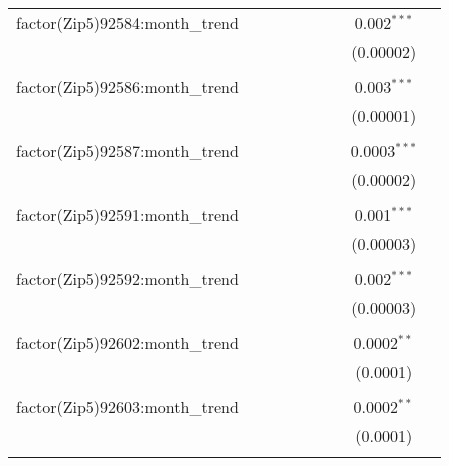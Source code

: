 \begin{table}[H]
{\begin{tabular}{@{\extracolsep{5pt}}lcccccccc}
  factor(Zip5)92584:month\_trend &  &  &  &  &  &  & 0.002$^{***}$ &  \\  

   &  &  &  &  &  &  & (0.00002) &  \\  

   & & & & & & & & \\  

  factor(Zip5)92586:month\_trend &  &  &  &  &  &  & 0.003$^{***}$ &  \\  

   &  &  &  &  &  &  & (0.00001) &  \\  

   & & & & & & & & \\  

  factor(Zip5)92587:month\_trend &  &  &  &  &  &  & 0.0003$^{***}$ &  \\  

   &  &  &  &  &  &  & (0.00002) &  \\  

   & & & & & & & & \\  

  factor(Zip5)92591:month\_trend &  &  &  &  &  &  & 0.001$^{***}$ &  \\  

   &  &  &  &  &  &  & (0.00003) &  \\  

   & & & & & & & & \\  

  factor(Zip5)92592:month\_trend &  &  &  &  &  &  & 0.002$^{***}$ &  \\  

   &  &  &  &  &  &  & (0.00003) &  \\  

   & & & & & & & & \\  

  factor(Zip5)92602:month\_trend &  &  &  &  &  &  & 0.0002$^{**}$ &  \\  

   &  &  &  &  &  &  & (0.0001) &  \\  

   & & & & & & & & \\  

  factor(Zip5)92603:month\_trend &  &  &  &  &  &  & 0.0002$^{**}$ &  \\  

   &  &  &  &  &  &  & (0.0001) &  \\  

   & & & & & & & & \\  


\end{tabular}}
\end{table}
